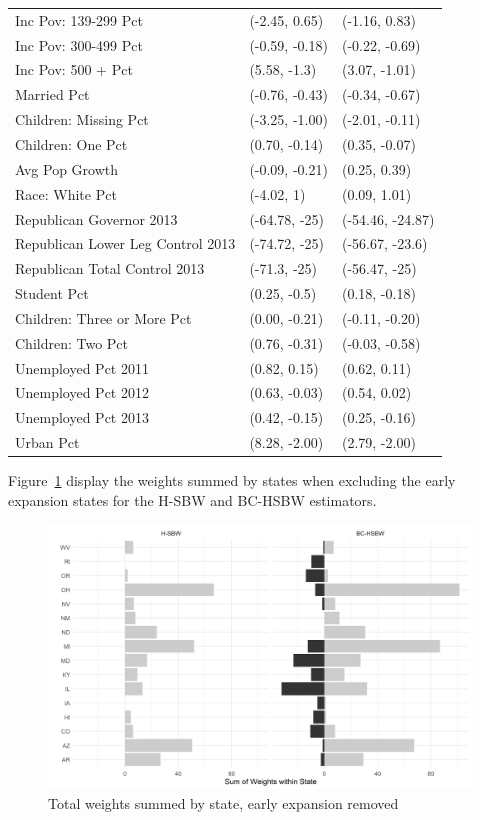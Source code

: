 \begin{table}[h!]
\begin{tabular}{lll}
  Inc Pov: 139-299 Pct & (-2.45, 0.65) & (-1.16, 0.83) \\ 
  Inc Pov: 300-499 Pct & (-0.59, -0.18) & (-0.22, -0.69) \\ 
  Inc Pov: 500 + Pct & (5.58, -1.3) & (3.07, -1.01) \\ 
  Married Pct & (-0.76, -0.43) & (-0.34, -0.67) \\ 
  Children: Missing Pct & (-3.25, -1.00) & (-2.01, -0.11) \\ 
  Children: One Pct & (0.70, -0.14) & (0.35, -0.07) \\ 
  Avg Pop Growth & (-0.09, -0.21) & (0.25, 0.39) \\ 
  Race: White Pct & (-4.02, 1) & (0.09, 1.01) \\ 
  Republican Governor 2013 & (-64.78, -25) & (-54.46, -24.87) \\ 
  Republican Lower Leg Control 2013 & (-74.72, -25) & (-56.67, -23.6) \\ 
  Republican Total Control 2013 & (-71.3, -25) & (-56.47, -25) \\ 
  Student Pct & (0.25, -0.5) & (0.18, -0.18) \\ 
  Children: Three or More Pct & (0.00, -0.21) & (-0.11, -0.20) \\ 
  Children: Two Pct & (0.76, -0.31) & (-0.03, -0.58) \\ 
  Unemployed Pct 2011 & (0.82, 0.15) & (0.62, 0.11) \\ 
  Unemployed Pct 2012 & (0.63, -0.03) & (0.54, 0.02) \\ 
  Unemployed Pct 2013 & (0.42, -0.15) & (0.25, -0.16) \\ 
  Urban Pct & (8.28, -2.00) & (2.79, -2.00) \\ 
   \hline
\end{tabular}
\end{table}

Figure~\ref{fig:weightsbystatec2} display the weights summed by states when excluding the early expansion states for the H-SBW and BC-HSBW estimators.

\begin{figure}[H]
\begin{center}
    \caption{Total weights summed by state, early expansion removed}
    \label{fig:weightsbystatec2}
    \includegraphics[scale=0.5]{01_Plots/weights-by-state-hsbw-c2.png}
\end{center}
\end{figure}

\clearpage